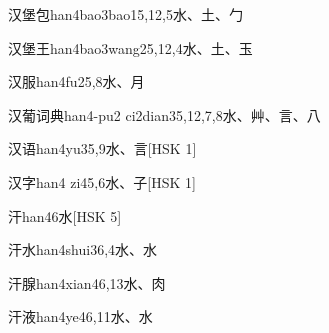 \begin{EntryWithPhonetic}{汉堡包}{han4bao3bao1}{5,12,5}{⽔、⼟、⼓}
\end{EntryWithPhonetic}

\begin{EntryWithPhonetic}{汉堡王}{han4bao3wang2}{5,12,4}{⽔、⼟、⽟}
\end{EntryWithPhonetic}

\begin{EntryWithPhonetic}{汉服}{han4fu2}{5,8}{⽔、⽉}
\end{EntryWithPhonetic}

\begin{EntryWithPhonetic}{汉葡词典}{han4-pu2 ci2dian3}{5,12,7,8}{⽔、⾋、⾔、⼋}
\end{EntryWithPhonetic}

\begin{EntryWithPhonetic}{汉语}{han4yu3}{5,9}{⽔、⾔}[HSK 1]
\end{EntryWithPhonetic}

\begin{EntryWithPhonetic}{汉字}{han4 zi4}{5,6}{⽔、⼦}[HSK 1]
\end{EntryWithPhonetic}

\begin{EntryWithPhonetic}{汗}{han4}{6}{⽔}[HSK 5]
\end{EntryWithPhonetic}

\begin{EntryWithPhonetic}{汗水}{han4shui3}{6,4}{⽔、⽔}
\end{EntryWithPhonetic}

\begin{EntryWithPhonetic}{汗腺}{han4xian4}{6,13}{⽔、⾁}
\end{EntryWithPhonetic}

\begin{EntryWithPhonetic}{汗液}{han4ye4}{6,11}{⽔、⽔}
\end{EntryWithPhonetic}

